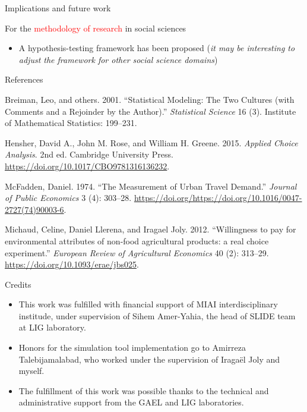 \documentclass[11pt,ignorenonframetext,]{beamer}
\providecommand{\tightlist}{%
  \setlength{\itemsep}{0pt}\setlength{\parskip}{0pt}}
\begin{document}
\begin{frame}{Implications and future work}
\protect\hypertarget{implications-and-future-work-2}{}

For the \textcolor{red}{methodology of research} in social sciences

\begin{itemize}
\tightlist
\item
  A hypothesis-testing framework has been proposed (\emph{it may be
  interesting to adjust the framework for other social science domains})
\end{itemize}

\end{frame}

\begin{frame}{References}
\protect\hypertarget{references}{}

\scriptsize

\hypertarget{refs}{}
\leavevmode\hypertarget{ref-breiman2001stat}{}%
Breiman, Leo, and others. 2001. ``Statistical Modeling: The Two Cultures
(with Comments and a Rejoinder by the Author).'' \emph{Statistical
Science} 16 (3). Institute of Mathematical Statistics: 199--231.

\leavevmode\hypertarget{ref-hensher2015}{}%
Hensher, David A., John M. Rose, and William H. Greene. 2015.
\emph{Applied Choice Analysis}. 2nd ed. Cambridge University Press.
\url{https://doi.org/10.1017/CBO9781316136232}.

\leavevmode\hypertarget{ref-mcfadden1974utd}{}%
McFadden, Daniel. 1974. ``The Measurement of Urban Travel Demand.''
\emph{Journal of Public Economics} 3 (4): 303--28.
\url{https://doi.org/https://doi.org/10.1016/0047-2727(74)90003-6}.

\leavevmode\hypertarget{ref-llerena2013rose}{}%
Michaud, Celine, Daniel Llerena, and Iragael Joly. 2012. ``Willingness
to pay for environmental attributes of non-food agricultural products: a
real choice experiment.'' \emph{European Review of Agricultural
Economics} 40 (2): 313--29. \url{https://doi.org/10.1093/erae/jbs025}.

\normalsize

\end{frame}

\begin{frame}{Credits}
\protect\hypertarget{credits}{}

\begin{itemize}
\item
  This work was fulfilled with financial support of MIAI
  interdisciplinary institude, under supervision of Sihem Amer-Yahia,
  the head of SLIDE team at LIG laboratory.
\item
  Honors for the simulation tool implementation go to Amirreza
  Talebijamalabad, who worked under the supervision of Iragaël Joly and
  myself.
\item
  The fulfillment of this work was possible thanks to the technical and
  administrative support from the GAEL and LIG laboratories.
\end{itemize}

\end{frame}
\end{document}
